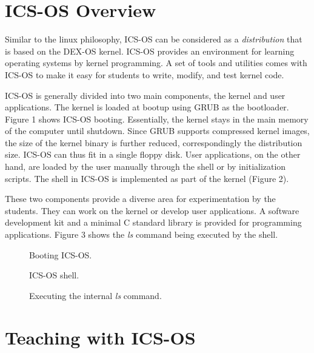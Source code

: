 \documentclass{acm_proc_article-sp}
\begin{document}
\section{ICS-OS Overview}
Similar to the linux philosophy, ICS-OS can be considered as a 
\textit{distribution} that is based on the DEX-OS kernel. ICS-OS provides 
an environment for learning operating systems by kernel programming. 
A set of tools and utilities comes with ICS-OS to make it easy for students
to write, modify, and test kernel code. 

ICS-OS is generally divided into two main components, the kernel and user 
applications. The kernel is loaded at bootup using GRUB as the bootloader.
Figure 1 shows ICS-OS booting. Essentially, the kernel stays in the main memory
of the computer until shutdown. Since GRUB supports compressed kernel images, 
the size of the kernel binary is further reduced, correspondingly the 
distribution size. ICS-OS can thus fit in a single floppy disk. User 
applications, on the other hand, are loaded by the user manually through the
shell or by initialization scripts. The shell in ICS-OS is implemented as part 
of the kernel (Figure 2).

These two components provide a diverse area for experimentation by the students.
They can work on the kernel or develop user applications. A software 
development kit and a minimal C standard library is provided for programming 
applications. Figure 3 shows the \textit{ls} command being executed by the 
shell.


\begin{figure}
\centering
{}
\caption{Booting ICS-OS.}
\end{figure}

\begin{figure}
\centering
{}
\caption{ICS-OS shell.}
\end{figure}

\begin{figure}
\centering
{}
\caption{Executing the internal \textit{ls} command.}
\end{figure}


\section{Teaching with ICS-OS}
\end{document}
